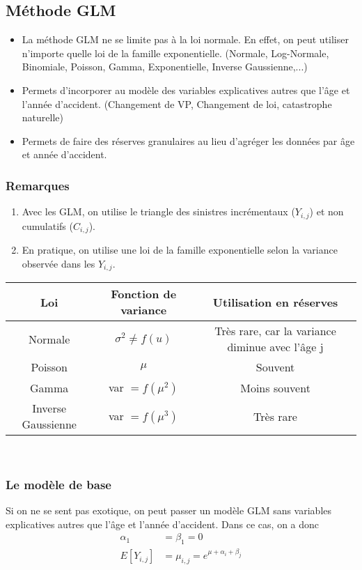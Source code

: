 \subsection*{ Méthode GLM}

\begin{itemize}
\item La méthode GLM ne se limite pas à la loi normale. En effet, on peut utiliser n'importe quelle loi de la famille exponentielle. (Normale, Log-Normale, Binomiale, Poisson, Gamma, Exponentielle, Inverse Gaussienne,...)
\item Permets d'incorporer au modèle des variables explicatives autres que l'âge et l'année d'accident. (Changement de VP, Changement de loi, catastrophe naturelle)
\item Permets de faire des réserves granulaires au lieu d'agréger les données par âge et année d'accident.
\end{itemize}

\subsubsection*{Remarques}
\begin{enumerate}
\item Avec les GLM, on utilise le triangle des sinistres incrémentaux ($Y_{i,j}$) et non cumulatifs ($C_{i,j}$).
\item En pratique, on utilise une loi de la famille exponentielle selon la variance observée dans les $Y_{i,j}$.
\end{enumerate}

\begin{tabular}{|c|c|c|}
  \hline
   Loi & Fonction de variance & Utilisation en réserves  \\
  \hline
  Normale & $\sigma^2 \neq f(u)$ & Très rare, car la variance diminue avec l'âge j \\
  Poisson & $\mu$ & Souvent \\
  Gamma & var $ = f(\mu^2)$ & Moins souvent \\
  Inverse Gaussienne & var $ = f(\mu^3)$ & Très rare  \\
  \hline
\end{tabular}\\
\subsubsection*{Le modèle de base}

Si on ne se sent pas exotique, on peut passer un modèle GLM sans variables explicatives autres que l'âge et l'année d'accident. Dans ce cas, on a donc
$$\begin{aligned}
\alpha_1 &= \beta_1 = 0 \\
E[Y_{i,j}] &= \mu_{i,j} = e^{\mu + \alpha_i + \beta_j} 
\end{aligned}$$

